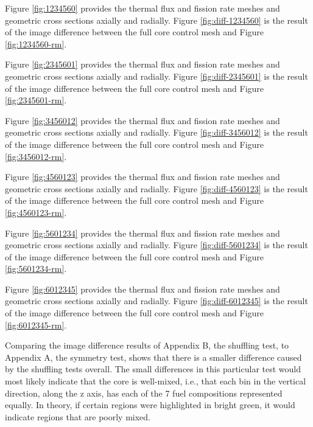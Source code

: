 


Figure \ref{fig:1234560} provides the thermal flux and fission rate meshes and geometric cross sections axially and radially.  Figure \ref{fig:diff-1234560} is the result of the image difference between the full core control mesh and Figure \ref{fig:1234560-rm}.




Figure \ref{fig:2345601} provides the thermal flux and fission rate meshes and geometric cross sections axially and radially.  Figure \ref{fig:diff-2345601} is the result of the image difference between the full core control mesh and Figure \ref{fig:2345601-rm}.




Figure \ref{fig:3456012} provides the thermal flux and fission rate meshes and geometric cross sections axially and radially.  Figure \ref{fig:diff-3456012} is the result of the image difference between the full core control mesh and Figure \ref{fig:3456012-rm}.




Figure \ref{fig:4560123} provides the thermal flux and fission rate meshes and geometric cross sections axially and radially.  Figure \ref{fig:diff-4560123} is the result of the image difference between the full core control mesh and Figure \ref{fig:4560123-rm}.




Figure \ref{fig:5601234} provides the thermal flux and fission rate meshes and geometric cross sections axially and radially.  Figure \ref{fig:diff-5601234} is the result of the image difference between the full core control mesh and Figure \ref{fig:5601234-rm}.




Figure \ref{fig:6012345} provides the thermal flux and fission rate meshes and geometric cross sections axially and radially.  Figure \ref{fig:diff-6012345} is the result of the image difference between the full core control mesh and Figure \ref{fig:6012345-rm}.

Comparing the image difference results of Appendix B, the shuffling test, to Appendix A, the symmetry test, shows that there is a smaller difference caused by the shuffling tests overall.  The small differences in this particular test would most likely indicate that the core is well-mixed, i.e., that each bin in the vertical direction, along the z axis, has each of the 7 fuel compositions represented equally.  In theory, if certain regions were highlighted in bright green, it would indicate regions that are poorly mixed.

